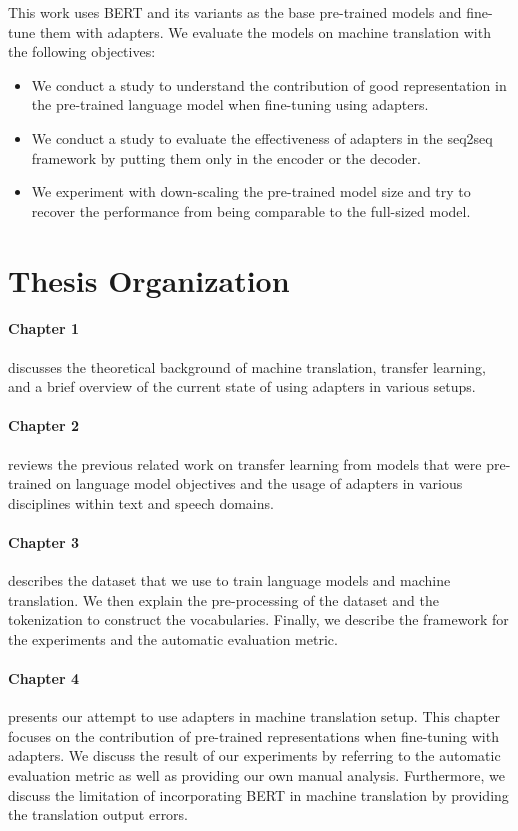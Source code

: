 This work uses BERT and its variants as the base pre-trained models and fine-tune them with adapters. We evaluate the models on machine translation with the following objectives:
\begin{itemize}
    \item We conduct a study to understand the contribution of good representation in the pre-trained language model when fine-tuning using adapters.
    \item We conduct a study to evaluate the effectiveness of adapters in the seq2seq framework by putting them only in the encoder or the decoder.
    \item We experiment with down-scaling the pre-trained model size and try to recover the performance from being comparable to the full-sized model.
\end{itemize}

\section*{Thesis Organization}

\paragraph{Chapter 1} discusses the theoretical background of machine translation, transfer learning, and a brief overview of the current state of using adapters in various setups.

\paragraph{Chapter 2} reviews the previous related work on transfer learning from models that were pre-trained on language model objectives and the usage of adapters in various disciplines within text and speech domains.

\paragraph{Chapter 3} describes the dataset that we use to train language models and machine translation. We then explain the pre-processing of the dataset and the tokenization to construct the vocabularies. Finally, we describe the framework for the experiments and the automatic evaluation metric.

\paragraph{Chapter 4} presents our attempt to use adapters in machine translation setup. This chapter focuses on the contribution of pre-trained representations when fine-tuning with adapters. We discuss the result of our experiments by referring to the automatic evaluation metric as well as providing our own manual analysis. Furthermore, we discuss the limitation of incorporating BERT in machine translation by providing the translation output errors.

